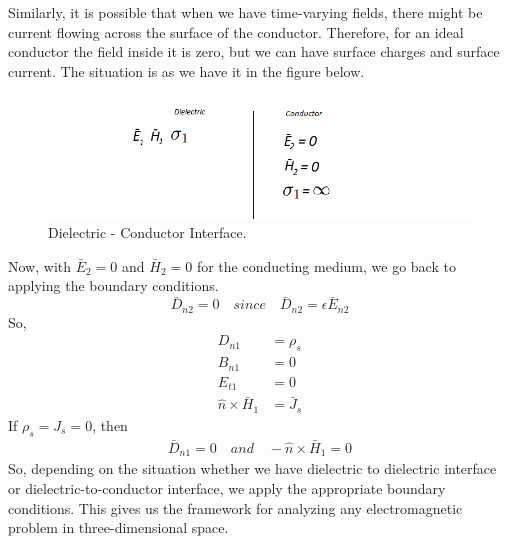 Similarly, it is possible that when we have time-varying fields, there might be current flowing across the surface of the conductor. Therefore, for an ideal conductor the field inside it is zero, but we can have surface charges and surface current. The situation is as we have it in the figure below.
\begin{figure}[h]
\centering
\includegraphics[width=1.2\linewidth]{./graphics/diemedium5_2_2}
\caption{Dielectric - Conductor Interface.}
\end{figure}

Now, with $\bar{E}_2 = 0$ and $\bar{H}_2 = 0$ for the conducting medium, we go back to applying the boundary conditions.
\begin{equation*}
\bar{D}_{n2} = 0\quad since\quad \bar{D}_{n2} = \epsilon\bar{E}_{n2}
\end{equation*}
So,
\begin{align*}
D_{n1} &= \rho_s \\
B_{n1} &= 0 \\
E_{t1} &= 0 \\
\hat{n}\times\bar{H}_1 &= \bar{J}_s
\end{align*}
If $\rho_s = J_s = 0$, then
\begin{align*}
\bar{D}_{n1} = 0\quad and \quad -\hat{n}\times\bar{H}_{1} = 0
\end{align*}
So, depending on the situation whether we have dielectric to dielectric interface or dielectric-to-conductor interface, we apply the appropriate boundary conditions. This gives us the framework for analyzing any electromagnetic problem in three-dimensional space. 

